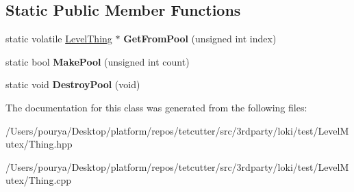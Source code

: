 \subsection*{Static Public Member Functions}
\begin{DoxyCompactItemize}
\item 
\hypertarget{classLevelThing_ac49206727abe1f93c32b1a922ff1074b}{}static volatile \hyperlink{classLevelThing}{Level\+Thing} $\ast$ {\bfseries Get\+From\+Pool} (unsigned int index)\label{classLevelThing_ac49206727abe1f93c32b1a922ff1074b}

\item 
\hypertarget{classLevelThing_abcff1d82e050844957c4b454988e2777}{}static bool {\bfseries Make\+Pool} (unsigned int count)\label{classLevelThing_abcff1d82e050844957c4b454988e2777}

\item 
\hypertarget{classLevelThing_a94315ccb2777f5b5305191140a681092}{}static void {\bfseries Destroy\+Pool} (void)\label{classLevelThing_a94315ccb2777f5b5305191140a681092}

\end{DoxyCompactItemize}


The documentation for this class was generated from the following files\+:\begin{DoxyCompactItemize}
\item 
/\+Users/pourya/\+Desktop/platform/repos/tetcutter/src/3rdparty/loki/test/\+Level\+Mutex/Thing.\+hpp\item 
/\+Users/pourya/\+Desktop/platform/repos/tetcutter/src/3rdparty/loki/test/\+Level\+Mutex/Thing.\+cpp\end{DoxyCompactItemize}
